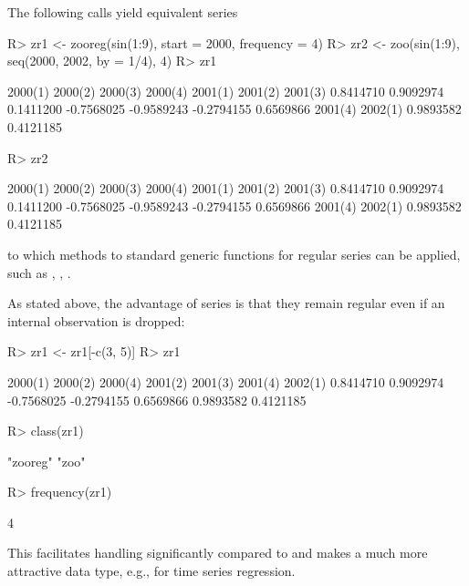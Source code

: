 \documentclass{Z}
\begin{document}
The following calls yield equivalent series

\begin{Schunk}
\begin{Sinput}
R> zr1 <- zooreg(sin(1:9), start = 2000, frequency = 4)
R> zr2 <- zoo(sin(1:9), seq(2000, 2002, by = 1/4), 4)
R> zr1
\end{Sinput}
\begin{Soutput}
   2000(1)    2000(2)    2000(3)    2000(4)    2001(1)    2001(2)    2001(3) 
 0.8414710  0.9092974  0.1411200 -0.7568025 -0.9589243 -0.2794155  0.6569866 
   2001(4)    2002(1) 
 0.9893582  0.4121185 
\end{Soutput}
\begin{Sinput}
R> zr2
\end{Sinput}
\begin{Soutput}
   2000(1)    2000(2)    2000(3)    2000(4)    2001(1)    2001(2)    2001(3) 
 0.8414710  0.9092974  0.1411200 -0.7568025 -0.9589243 -0.2794155  0.6569866 
   2001(4)    2002(1) 
 0.9893582  0.4121185 
\end{Soutput}
\end{Schunk}

to which methods to standard generic functions for regular series can be
applied, such as , , .

As stated above, the advantage of  series is that they remain
regular even if an internal observation is dropped:

\begin{Schunk}
\begin{Sinput}
R> zr1 <- zr1[-c(3, 5)]
R> zr1
\end{Sinput}
\begin{Soutput}
   2000(1)    2000(2)    2000(4)    2001(2)    2001(3)    2001(4)    2002(1) 
 0.8414710  0.9092974 -0.7568025 -0.2794155  0.6569866  0.9893582  0.4121185 
\end{Soutput}
\begin{Sinput}
R> class(zr1)
\end{Sinput}
\begin{Soutput}
[1] "zooreg" "zoo"   
\end{Soutput}
\begin{Sinput}
R> frequency(zr1)
\end{Sinput}
\begin{Soutput}
[1] 4
\end{Soutput}
\end{Schunk}

This facilitates  handling significantly compared to  and makes
 a much more attractive data type, e.g., for time series regression.
\end{document}
